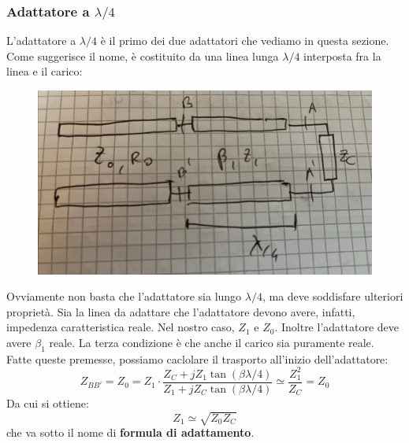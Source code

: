 \documentclass{book}
\begin{document}
    \subsubsection{Adattatore a $\lambda/4$}
        L'adattatore a $\lambda/4$ è il primo dei due adattatori che vediamo in questa sezione. Come suggerisce il nome,
        è costituito da una linea lunga $\lambda/4$ interposta fra la linea e il carico:
        \begin{figure}[h!]
            \center  
            \includegraphics[width=0.6\linewidth]{Chapter_two/Chapt2img18.png}
        \end{figure}
        Ovviamente non basta che l'adattatore sia lungo $\lambda/4$, ma deve soddisfare ulteriori proprietà.
        Sia la linea da adattare che l'adattatore devono avere, infatti, impedenza caratteristica reale. Nel nostro caso, $Z_{1}$ e $Z_{0}$. Inoltre 
        l'adattatore deve avere $\beta_{1}$ reale. La terza condizione è che anche il carico sia puramente reale.
        \\ Fatte queste premesse, possiamo caclolare il trasporto all'inizio dell'adattatore:
        \begin{equation}
            Z_{BB'} = Z_{0} = Z_{1} \cdot \frac{Z_{C}+jZ_{1}\tan(\beta \lambda /4)}{Z_{1}+jZ_{C}\tan(\beta \lambda /4)} \simeq \frac{Z_{1} ^{2}}{Z_{C}} = Z_{0}
        \end{equation}
        Da cui si ottiene:
        \begin{equation}
            Z_{1} \simeq \sqrt{Z_{0}Z_{C}}
        \end{equation}
        che va sotto il nome di \textbf{formula di adattamento}.
    \newpage
\end{document}
